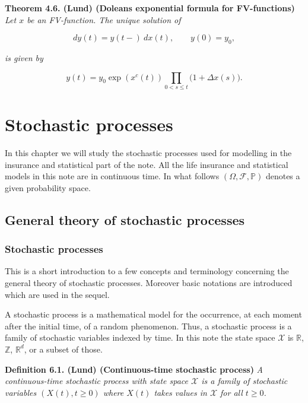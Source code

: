 \documentclass[a4paper,10pt,openany]{book}
\begin{document}
\textbf{Theorem 4.6. (Lund) (Doleans exponential formula for FV-functions)} \emph{Let \(x\) be an FV-function. The unique solution of}

\[
dy(t)=y(t-)\ dx(t),\qquad y(0)=y_0,
\]

\emph{is given by}

\[
y(t)=y_0\exp(x^c(t))\prod_{0<s\le t}\big(1+\Delta x(s)\big).
\]

\hypertarget{stochastic-processes}{%
\section{Stochastic processes}\label{stochastic-processes}}

In this chapter we will study the stochastic processes used for modelling in the insurance and statistical part of the note. All the life insurance and statistical models in this note are in continuous time. In what follows \((\Omega,\mathcal F,\mathbb P)\) denotes a given probability space.

\hypertarget{general-theory-of-stochastic-processes}{%
\subsection{General theory of stochastic processes}\label{general-theory-of-stochastic-processes}}

\hypertarget{stochastic-processes-1}{%
\subsubsection{Stochastic processes}\label{stochastic-processes-1}}

This is a short introduction to a few concepts and terminology concerning the general theory of stochastic processes. Moreover basic notations are introduced which are used in the sequel.

A stochastic process is a mathematical model for the occurrence, at each moment after the initial time, of a random phenomenon. Thus, a stochastic process is a family of stochastic variables indexed by time. In this note the state space \(\mathcal X\) is \(\mathbb R\), \(\mathbb Z\), \(\mathbb R^d\), or a subset of those.

\textbf{Definition 6.1. (Lund) (Continuous-time stochastic process)} \emph{A continuous-time stochastic process with state space \(\mathcal X\) is a family of stochastic variables \((X(t),t \ge 0)\) where \(X(t)\) takes values in \(\mathcal X\) for all \(t \ge 0\).}
\end{document}
